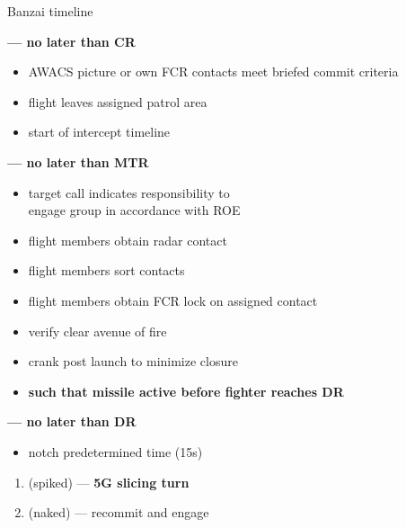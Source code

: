 \begin{checklistenumerate}[start=0]
{\begin{tikzpicture}[figstyle]
        \end{tikzpicture}
        \caption{Banzai timeline}
        \label{fig:ttp_aa:timeline:banzai}
    }%
    \textbf{--- no later than CR}
    \begin{itemize}
        \item AWACS picture or own FCR contacts meet briefed commit criteria
        \item flight leaves assigned patrol area
        \item start of intercept timeline
    \end{itemize}

    \blueitem[Target] \textbf{--- no later than MTR}
    \label{subsec:ttp_aa:timeline:banzai:target}
    \begin{itemize}
        \item target call indicates responsibility to \\
        engage group in accordance with ROE
        \item flight members obtain radar contact
    \end{itemize}

    \blueitem[Sort]
    \label{subsec:ttp_aa:timeline:banzai:sort}
    \begin{itemize}
        \item flight members sort contacts
        \item flight members obtain FCR lock on assigned contact
    \end{itemize}

    \label{subsec:ttp_aa:timeline:banzai:shoot}
    \begin{itemize} 
        \item verify clear avenue of fire
        \item crank post launch to minimize closure
        \item \textbf{such that missile active before fighter reaches DR}
    \end{itemize}
    
    \blueitem[Notch] \textbf{--- no later than DR}
    \label{subsec:ttp_aa:timeline:banzai:notch}
    \begin{itemize} 
        \item notch predetermined time (15s)
    \end{itemize}
    \begin{enumerate}[label=\textbf{\arabic{enumi}\alph*.}]
        \item {} (spiked) --- \textbf{5G slicing turn}%
        \label{subsec:ttp_aa:timeline:banzai:abort}%
        \item {} (naked) --- recommit and engage%
        \label{subsec:ttp_aa:timeline:banzai:banzai}%
    \end{enumerate}
    
\end{checklistenumerate}

